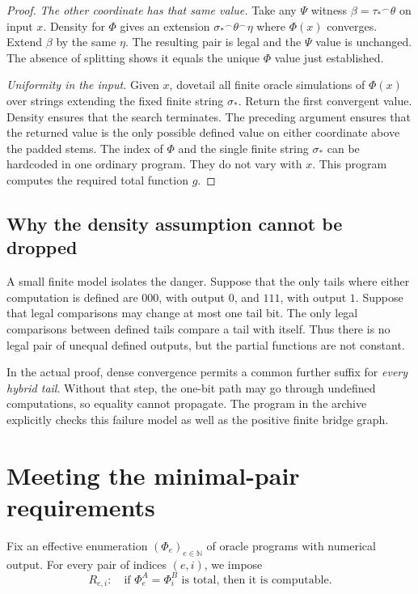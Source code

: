 \documentclass[11pt,a4paper]{article}
\newcommand{\N}{\mathbb N}
\newcommand{\concat}{\mathbin{{}^{\frown}}}
\theoremstyle{definition}
\theoremstyle{remark}
\begin{document}
\begin{proof}
\textit{The other coordinate has that same value.}
Take any $\Psi$ witness $\beta=\tau_*\concat\theta$ on input $x$. Density for $\Phi$ gives an extension $\sigma_*\concat\theta\concat\eta$ where $\Phi(x)$ converges. Extend $\beta$ by the same $\eta$. The resulting pair is legal and the $\Psi$ value is unchanged. The absence of splitting shows it equals the unique $\Phi$ value just established.

\textit{Uniformity in the input.}
Given $x$, dovetail all finite oracle simulations of $\Phi(x)$ over strings extending the fixed finite string $\sigma_*$. Return the first convergent value. Density ensures that the search terminates. The preceding argument ensures that the returned value is the only possible defined value on either coordinate above the padded stems. The index of $\Phi$ and the single finite string $\sigma_*$ can be hardcoded in one ordinary program. They do not vary with $x$. This program computes the required total function $g$.
\end{proof}

\subsection{Why the density assumption cannot be dropped}
A small finite model isolates the danger. Suppose that the only tails where either computation is defined are $000$, with output $0$, and $111$, with output $1$. Suppose that legal comparisons may change at most one tail bit. The only legal comparisons between defined tails compare a tail with itself. Thus there is no legal pair of unequal defined outputs, but the partial functions are not constant.

In the actual proof, dense convergence permits a common further suffix for \emph{every hybrid tail}. Without that step, the one-bit path may go through undefined computations, so equality cannot propagate. The program in the archive explicitly checks this failure model as well as the positive finite bridge graph.

\section{Meeting the minimal-pair requirements}\label{sec:requirements}
Fix an effective enumeration $(\Phi_e)_{e\in\N}$ of oracle programs with numerical output. For every pair of indices $(e,i)$, we impose
\[
R_{e,i}:\quad
\text{if }\Phi_e^A=\Phi_i^B\text{ is total, then it is computable}.
\]
\end{document}
